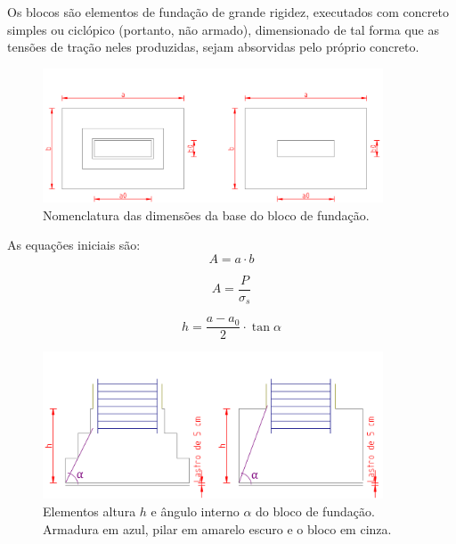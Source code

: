 Os blocos são elementos de fundação de grande rigidez, executados com concreto simples ou ciclópico (portanto, não armado), dimensionado de tal forma que as tensões de tração neles produzidas, sejam absorvidas pelo próprio concreto.

\begin{figure}[htb]
	\begin{center}
	\caption{Nomenclatura das dimensões da base do bloco de fundação.}
    	\includegraphics[width=0.9\textwidth]{Fundacoes-rasas-ou-diretas/Imagens/Bloco-de-fundacao-1.png}
	\end{center}
\end{figure}

As equações iniciais são:
\begin{equation}
A=a\cdot b
\end{equation}

\begin{equation}
A=\frac{P}{\sigma_s}
\end{equation}

\begin{equation}
h=\frac{a-a_0}{2}\cdot \tan{\alpha}
\end{equation}

\begin{figure}[htb]
	\begin{center}
	\caption{Elementos altura $h$ e ângulo interno $\alpha$ do bloco de fundação. Armadura em azul, pilar em amarelo escuro e o bloco em cinza.}
    	\includegraphics[width=0.9\textwidth]{Fundacoes-rasas-ou-diretas/Imagens/Bloco-de-fundacao-2.png}
	\end{center}
\end{figure}


